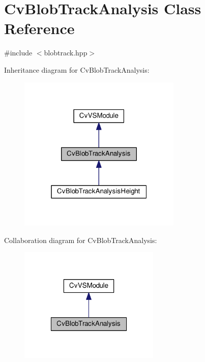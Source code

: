 \hypertarget{classCvBlobTrackAnalysis}{\section{Cv\-Blob\-Track\-Analysis Class Reference}
\label{classCvBlobTrackAnalysis}
}


{\ttfamily \#include $<$blobtrack.\-hpp$>$}



Inheritance diagram for Cv\-Blob\-Track\-Analysis\-:\nopagebreak
\begin{figure}[H]
\begin{center}
\leavevmode
\includegraphics[width=220pt]{classCvBlobTrackAnalysis__inherit__graph}
\end{center}
\end{figure}


Collaboration diagram for Cv\-Blob\-Track\-Analysis\-:\nopagebreak
\begin{figure}[H]
\begin{center}
\leavevmode
\includegraphics[width=190pt]{classCvBlobTrackAnalysis__coll__graph}
\end{center}
\end{figure}
